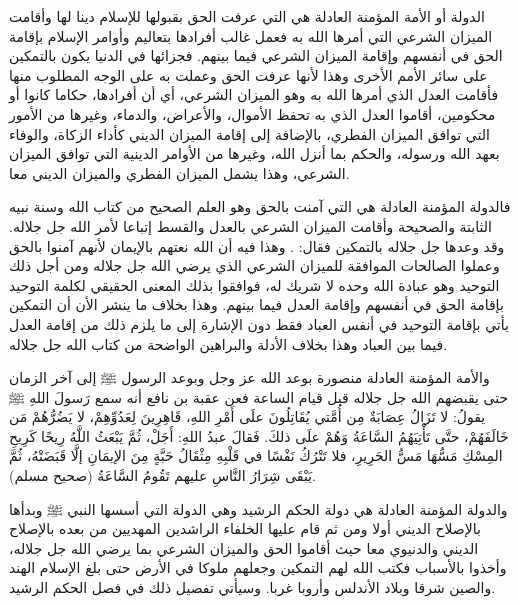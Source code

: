 الدولة أو الأمة المؤمنة العادلة هي التي عرفت الحق بقبولها للإسلام دينا لها وأقامت الميزان الشرعي التي أمرها الله به فعمل غالب أفرادها بتعاليم وأوامر الإسلام بإقامة الحق في أنفسهم وإقامة الميزان الشرعي فيما بينهم. فجزائها في الدنيا يكون بالتمكين على سائر الأمم الأخرى وهذا لأنها عرفت الحق وعملت به على الوجه المطلوب منها فأقامت العدل الذي أمرها الله به وهو الميزان الشرعي، أي أن أفرادها، حكاما كانوا أو محكومين، أقاموا العدل الذي به تحفظ الأموال، والأعراض، والدماء، وغيرها من الأمور التي توافق الميزان الفطري، بالإضافة إلى إقامة الميزان الديني كأداء الزكاة، والوفاء بعهد الله ورسوله، والحكم بما أنزل الله، وغيرها من الأوامر الدينية التي توافق الميزان الشرعي، وهذا يشمل الميزان الفطري والميزان الديني معا.

فالدولة المؤمنة العادلة هي التي آمنت بالحق وهو العلم الصحيح من كتاب الله وسنة نبيه الثابتة والصحيحة وأقامت الميزان الشرعي بالعدل والقسط إتباعا لأمر الله جل جلاله. وقد وعدها جل جلاله بالتمكين فقال: \quranayah*[24][55]{\footnotesize \surahname*[24]}. وهذا فيه أن الله نعتهم بالإيمان لأنهم آمنوا بالحق وعملوا الصالحات الموافقة للميزان الشرعي الذي يرضي الله جل جلاله ومن أجل ذلك التوحيد وهو عبادة الله وحده لا شريك له، فوافقوا بذلك المعنى الحقيقي لكلمة التوحيد بإقامة الحق في أنفسهم وإقامة العدل فيما بينهم. وهذا بخلاف ما ينشر الأن أن التمكين يأتي بإقامة التوحيد في أنفس العباد فقط دون الإشارة إلى ما يلزم ذلك من إقامة العدل فيما بين العباد وهذا بخلاف الأدلة والبراهين الواضحة من كتاب الله جل جلاله. 

والأمة المؤمنة العادلة منصورة بوعد الله عز وجل وبوعد الرسول ﷺ إلى آخر الزمان حتى يقبضهم الله جل جلاله قبل قيام الساعة فعن عقبة بن نافع أنه سمع رَسولَ اللهِ ﷺ يقولُ: لا تَزَالُ عِصَابَةٌ مِن أُمَّتي يُقَاتِلُونَ علَى أَمْرِ اللهِ، قَاهِرِينَ لِعَدُوِّهِمْ، لا يَضُرُّهُمْ مَن خَالَفَهُمْ، حتَّى تَأْتِيَهُمُ السَّاعَةُ وَهُمْ علَى ذلكَ. فَقالَ عبدُ اللهِ: أَجَلْ، ثُمَّ يَبْعَثُ اللَّهُ رِيحًا كَرِيحِ المِسْكِ مَسُّهَا مَسُّ الحَرِيرِ، فلا تَتْرُكُ نَفْسًا في قَلْبِهِ مِثْقَالُ حَبَّةٍ مِنَ الإيمَانِ إلَّا قَبَضَتْهُ، ثُمَّ يَبْقَى شِرَارُ  النَّاسِ عليهم تَقُومُ السَّاعَةُ {\footnotesize (صحيح مسلم)}.

والدولة المؤمنة العادلة هي دولة الحكم الرشيد وهي الدولة التي أسسها النبي ﷺ وبدأها بالإصلاح الديني أولا ومن ثم قام عليها الخلفاء الراشدين المهديين من بعده بالإصلاح الديني والدنيوي معا حيث أقاموا الحق والميزان الشرعي بما يرضي الله جل جلاله، وأخذوا بالأسباب فكتب الله لهم التمكين وجعلهم ملوكا في الأرض حتى بلغ الإسلام الهند والصين شرقا وبلاد الأندلس وأروبا غربا. وسيأتي تفصيل ذلك في فصل الحكم الرشيد.

